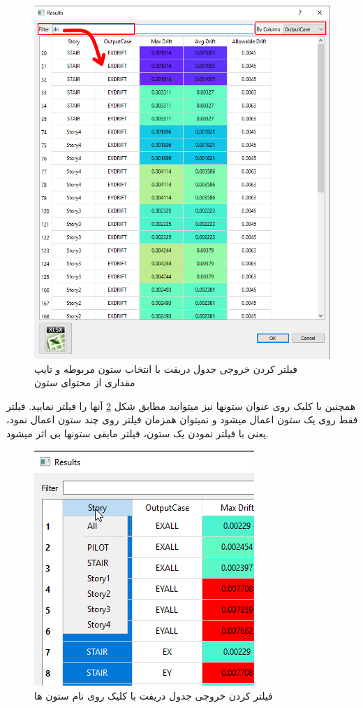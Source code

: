 \begin{figure}[H]
   \centering
   \includegraphics[scale=0.7]{figures/drift}
   \caption{فیلتر کردن خروجی جدول دریفت با انتخاب ستون مربوطه و تایپ  مقداری از محتوای ستون}
   \label{pic:drift}
\end{figure}

همچنین با کلیک روی عنوان ستونها نیز میتوانید مطابق شکل 
\ref{pic:drift_filter}
 آنها را فیلتر نمایید. فیلتر فقط روی یک ستون اعمال میشود و نمیتوان همزمان فیلتر روی چند ستون اعمال نمود، یعنی با فیلتر نمودن یک ستون، فیلتر مابقی ستونها بی اثر میشود.
 
 
\begin{figure}[H]
    \centering
    \includegraphics[scale=0.7]{figures/drift_filter}
    \caption{فیلتر کردن خروجی جدول دریفت با کلیک روی نام ستون ها}
    \label{pic:drift_filter}
\end{figure}


